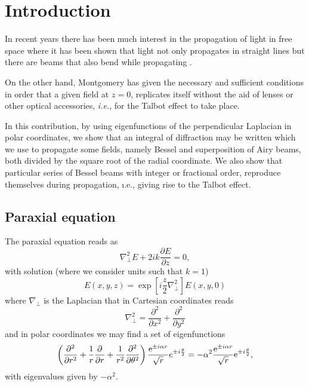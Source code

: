 \documentclass[aps,pra,reprint,superscriptaddress]{revtex4-2}
\begin{document}
\date{\today}
\maketitle
\section{Introduction} In recent years there has been much interest in the propagation of light in free space where it has been shown that light not only propagates in straight lines but there are beams that also bend while propagating \cite{berry_1979,PhysRevLett.99.213901,Hwang2010,Cerda2011,Yan2012,Vaveliuk2014,Jauregui2014,Vaveliuk2015,Kaganovsky2010,Papazoglou2015,Torre2015,Aleahmad2016,Weisman2017,Mansour2018,Rozenman2019}.

On the other hand, Montgomery \cite{Montgomery1967} has given the necessary and sufficient conditions  in order that a given field at $z=0$, replicates itself without the aid of lenses or other optical accessories, {\it i.e.}, for the Talbot effect to take place. 

In this contribution, by using eigenfunctions of the perpendicular Laplacian in polar coordinates, we show that an integral of diffraction may be written which we use to propagate some fields, namely Bessel and superposition of Airy beams, both divided by the square root of the radial coordinate. We also show that particular series of Bessel beams with integer or fractional order, reproduce themselves during propagation, {\i.e.}, giving rise to the Talbot effect.

\subsection{Paraxial equation} The paraxial equation reads as
%
%
\begin{equation}
    \nabla_{\perp}^2E+2ik \frac{\partial E}{\partial z}=0,
\end{equation}
%
%
with solution (where we consider units such that $k = 1$)
%
%
\begin{equation}\label{sol}
   E(x,y,z)=\exp\left[ i\frac{z}{2}\nabla_{\perp}^2\right]E(x,y,0)
\end{equation}
%
%
where $\nabla_{\perp}$ is the Laplacian that in Cartesian coordinates reads
%
%
\begin{equation}
    \nabla_{\perp}^2=\frac{\partial^2}{\partial x^2}+\frac{\partial^2}{\partial y^2}
\end{equation}
%
%
and in polar coordinates we may find a set of eigenfunctions
%
%
\begin{eqnarray}\label{eigen}
  \left(\frac{\partial^2 }{\partial r^2}+\frac{1}{r}\frac{\partial}{\partial r}+\frac{1}{r^2}\frac{\partial^2}{\partial \theta^2}\right)\frac{\hbox{e}^{\pm i\alpha r}}{\sqrt{r}}e^{\pm i\frac{\theta}{2}}=
  -\alpha^2 \frac{\hbox{e}^{\pm i\alpha r}}{\sqrt{r}}\hbox{e}^{\pm i\frac{\theta}{2}},
\end{eqnarray}
%
%
with eigenvalues given by $-\alpha^2$.
\end{document}
